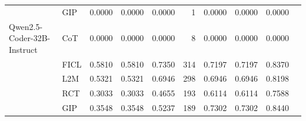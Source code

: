 \documentclass[conference]{IEEEtran}
\begin{document}
\begin{longtable}{p{3.5cm} l r r r r r r r r}
                            & GIP  & 0.0000 & 0.0000 & 0.0000 & 1  & 0.0000 & 0.0000 & 0.0000 \\
Qwen2.5-Coder-32B-Instruct  & CoT  & 0.0000 & 0.0000 & 0.0000 & 8  & 0.0000 & 0.0000 & 0.0000 \\
                            & FICL & 0.5810 & 0.5810 & 0.7350 & 314 & 0.7197 & 0.7197 & 0.8370 \\
                            & L2M  & 0.5321 & 0.5321 & 0.6946 & 298 & 0.6946 & 0.6946 & 0.8198 \\
                            & RCT  & 0.3033 & 0.3033 & 0.4655 & 193 & 0.6114 & 0.6114 & 0.7588 \\
                            & GIP  & 0.3548 & 0.3548 & 0.5237 & 189 & 0.7302 & 0.7302 & 0.8440 \\


  \bottomrule

\end{longtable}
\end{document}

